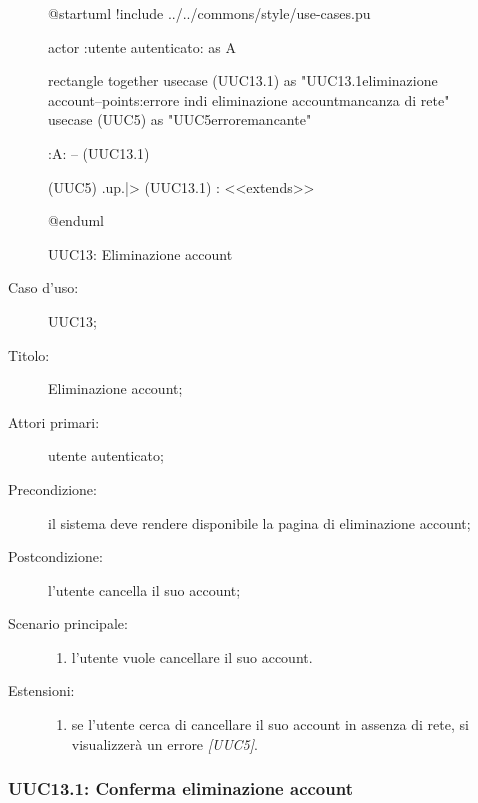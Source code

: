 \documentclass[../../../analisi-dei-requisiti.tex]{subfiles}
\begin{document}
\begin{figure}[H]
  \centering
  \begin{plantuml}
  @startuml
  !include ../../commons/style/use-cases.pu

  actor :utente autenticato: as A

  rectangle {
    together {
      usecase (UUC13.1) as "UUC13.1\nConferma eliminazione account\n--\nExtension points:\nVisualizzazione errore in\ncaso di eliminazione account\nin mancanza di rete"
      usecase (UUC5) as "UUC5\nVisualizzazione errore\nrete mancante"
    }
  }

  :A: -- (UUC13.1)

  (UUC5) .up.|> (UUC13.1) : <<extends>>

  @enduml
  \end{plantuml}
  \caption{UUC13: Eliminazione account}%
  \label{fig:uuc13}
\end{figure}

\begin{description}
  \item[Caso d’uso:] UUC13;
  \item[Titolo:] Eliminazione account;
  \item[Attori primari:] utente autenticato;
  \item[Precondizione:] il sistema deve rendere disponibile la pagina di eliminazione account;
  \item[Postcondizione:] l'utente cancella il suo account;
  \item[Scenario principale:]
        \begin{enumerate}
          \item l'utente vuole cancellare il suo account.
        \end{enumerate}
        \item[Estensioni:]
        \begin{enumerate}
          \item se l'utente cerca di cancellare il suo account in assenza di rete, si visualizzerà un errore \emph{[UUC5]}.
        \end{enumerate}
\end{description}

\subsubsection{UUC13.1: Conferma eliminazione account}%
\label{subs:UUC13.1}
\end{document}
